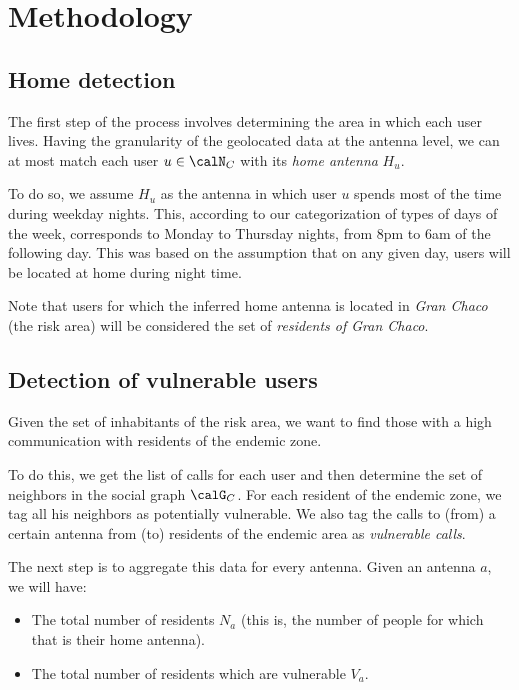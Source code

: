 
\section{Methodology}

\subsection{Home detection}

    The first step of the process involves determining the area in which each user lives. Having the granularity of the geolocated data at the antenna level, we can at most match each user $u \in \calN_C$ with its \textit{home antenna} $H_u$.

    To do so, we assume $H_u$ as the antenna in which user $u$ spends most of the time during weekday nights. This, according to our categorization of types of days of the week, corresponds to Monday to Thursday nights, from 8pm to 6am of the following day. This was based on the assumption that on any given day, users will be located at home during night time.
    
    Note that users for which the inferred home antenna is located in \textit{Gran Chaco} (the risk area) will be considered the set of \textit{residents of Gran Chaco}.

\subsection{Detection of vulnerable users}
    Given the set of inhabitants of the risk area, we want to find those with a high communication with residents of the endemic zone.
    
    To do this, we get the list of calls for each user and then determine the set of neighbors in the social graph $\calG_C$. For each resident of the endemic zone, we tag all his neighbors as potentially vulnerable. We also tag the calls to (from) a certain antenna from (to) residents of the endemic area as \textit{vulnerable calls}.
    
    The next step is to aggregate this data for every antenna. Given an antenna $a$, we will have:
    \begin{itemize}
        \item The total number of residents $N_a$ (this is, the number of people for which that is their home antenna).
        \item The total number of residents which are vulnerable $V_a$.
    \end{itemize}
    
